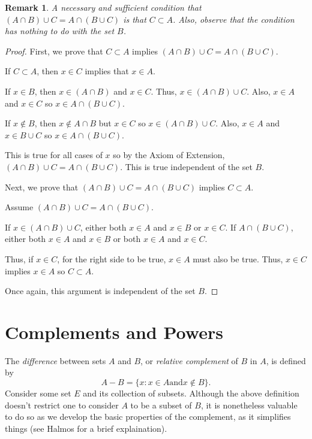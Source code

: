 \documentclass[12pt]{article}
\newtheorem{remark}{Remark}
\begin{document}
\begin{remark}
    A necessary and sufficient condition that $(A \cap B) \cup C = A \cap (B \cup C)$ is that $C \subset A$.
    Also, observe that the condition has nothing to do with the set $B$.
\end{remark}
\begin{proof}
    First, we prove that $C \subset A$ implies $(A \cap B) \cup C = A \cap (B \cup C)$.

    If $C \subset A$, then $x \in C$ implies that $x \in A$.

    If $x \in B$, then $x \in (A \cap B)$ and $x \in C$. Thus, $x \in (A \cap B) \cup C$.
    Also, $x \in A$ and $x \in C$ so $x \in A \cap (B \cup C)$.

    If $x \notin B$, then $x \notin A \cap B$ but $x \in C$ so $x \in (A \cap B) \cup C$.
    Also, $x \in A$ and $x \in B \cup C$ so $x \in A \cap(B \cup C)$.

    This is true for all cases of $x$ so by the Axiom of Extension, $(A \cap B) \cup C = A \cap (B \cup C)$.
    This is true independent of the set $B$.

    Next, we prove that $(A \cap B) \cup C = A \cap (B \cup C)$ implies $C \subset A$.

    Assume $(A \cap B) \cup C = A \cap (B \cup C)$.

    If $x \in (A \cap B) \cup C$, either both $x \in A$ and $x \in B$ or $x \in C$.
    If $A \cap (B \cup C)$, either both $x \in A$ and $x \in B$ or both $x \in A$ and $x \in C$.

    Thus, if $x \in C$, for the right side to be true, $x \in A$ must also be true. Thus, $x \in C$ implies $x \in A$
    so $C \subset A$.

    Once again, this argument is independent of the set $B$.
\end{proof}

\section{Complements and Powers}
The \textit{difference}  between sets $A$ and $B$, or \textit{relative complement} of $B$ in $A$, is
defined by
\begin{equation}
    A- B = \{x: x \in A \text{and} x \notin B\}.
\end{equation}
Consider some set $E$ and its collection of subsets. Although the above definition doesn't restrict one
to consider $A$ to be a subset of $B$, it is nonetheless valuable to do so as we develop the basic properties
of the complement, as it simplifies things (see Halmos for a brief explaination).
\end{document}
